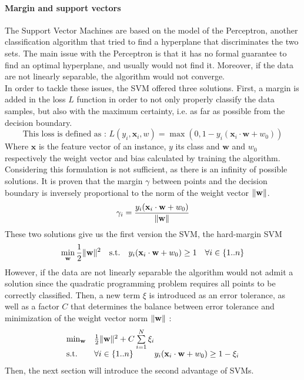 \documentclass{article}
\DeclarePairedDelimiter{\norm}{\lVert}{\rVert}
\let\vec\mathbf
\theoremstyle{definition}
\begin{document}
\paragraph{Margin and support vectors}
The Support Vector Machines are based on the model of the Perceptron\cite{freund1999large}, another classification algorithm that tried to find a hyperplane that discriminates the two sets. The main issue with the Perceptron is that it has no formal guarantee to find an optimal hyperplane, and usually would not find it. Moreover, if the data are not linearly separable, the algorithm would not converge.\\
In order to tackle these issues, the SVM offered three solutions. First, a margin is added in the loss $L$ function in order to not only properly classify the data samples, but also with the maximum certainty, i.e. as far as possible from the decision boundary.
\begin{equation}
    \text{This loss is defined as : } L(y_i ,\vec{x}_i,w) = \max(0,1-y_i( \vec{x}_i\cdot \vec{w} + w_{0}))
\end{equation}
Where $\vec{x}$ is the feature vector of an instance, $y$ its class and $\vec{w}$ and $w_{0}$ respectively the weight vector and bias calculated by training the algorithm.
Considering this formulation is not sufficient, as there is an infinity of possible solutions. It is proven that the margin $\gamma$ between points and the decision boundary is inversely proportional to the norm of the weight vector $\norm{\vec{w}}$.\\
\begin{equation}
\gamma_i = \frac{y_{i}(\vec{x}_{i} \cdot \vec{w} + w_{0})}{\norm{\vec{w}}}
\end{equation}
These two solutions give us the first version the SVM, the hard-margin SVM\\ 
\begin{equation}
    \min_{\vec{w}} \frac{1}{2}\norm{\vec{w}}^{2} \quad
\textup{s.t.}\quad y_{i}(\vec{x}_{i} \cdot \vec{w} + w_{0}) \geq 1 \quad \forall i \in \{1..n\}
\end{equation}
However, if the data are not linearly separable the algorithm would not admit a solution since the quadratic programming problem requires all points to be correctly classified. Then, a new term $\xi$ is introduced as an error tolerance, as well as a factor $C$ that determines the balance between error tolerance and minimization of the weight vector norm $\norm{\vec{w}}$ :\\
\begin{equation}
\begin{array}{ll@{}ll}
\min_{\vec{w}}  & \frac{1}{2}\norm{\vec{w}}^{2}+C\sum\limits_{i=1}^{N}\xi_{i} &\\
\text{s.t.}& \forall i \in \{1..n\} & y_{i}(\vec{x}_{i} \cdot \vec{w} + w_{0}) \geq 1-\xi_{i}
\end{array}
\end{equation}
Then, the next section will introduce the second advantage of SVMs.
\end{document}
